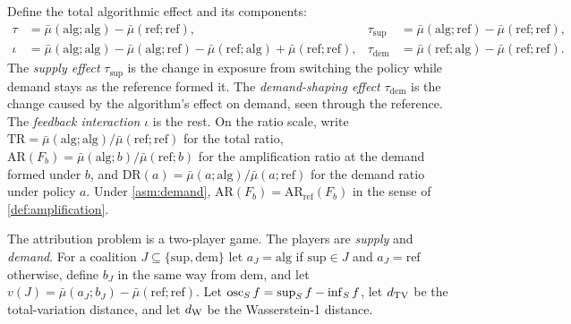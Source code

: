 Define the total algorithmic effect and its components:
\begin{equation}\label{eq:est-components}
\begin{aligned}
  \tau&=\bar\mu(\mathrm{alg};\mathrm{alg})-\bar\mu(\mathrm{ref};\mathrm{ref}), &
  \tau_{\mathrm{sup}}&=\bar\mu(\mathrm{alg};\mathrm{ref})-\bar\mu(\mathrm{ref};\mathrm{ref}),\\
  \iota&=\bar\mu(\mathrm{alg};\mathrm{alg})-\bar\mu(\mathrm{alg};\mathrm{ref})-\bar\mu(\mathrm{ref};\mathrm{alg})+\bar\mu(\mathrm{ref};\mathrm{ref}), &
  \tau_{\mathrm{dem}}&=\bar\mu(\mathrm{ref};\mathrm{alg})-\bar\mu(\mathrm{ref};\mathrm{ref}).
\end{aligned}
\end{equation}
The \emph{supply effect} $\tau_{\mathrm{sup}}$ is the change in exposure from switching the policy while demand stays as the reference formed it. The \emph{demand-shaping effect} $\tau_{\mathrm{dem}}$ is the change caused by the algorithm's effect on demand, seen through the reference. The \emph{feedback interaction} $\iota$ is the rest. On the ratio scale, write $\mathrm{TR}=\bar\mu(\mathrm{alg};\mathrm{alg})/\bar\mu(\mathrm{ref};\mathrm{ref})$ for the total ratio, $\mathrm{AR}(F_b)=\bar\mu(\mathrm{alg};b)/\bar\mu(\mathrm{ref};b)$ for the amplification ratio at the demand formed under $b$, and $\mathrm{DR}(a)=\bar\mu(a;\mathrm{alg})/\bar\mu(a;\mathrm{ref})$ for the demand ratio under policy $a$. Under \cref{asm:demand}, $\mathrm{AR}(F_b)=\mathrm{AR}_{\mathrm{ref}}(F_b)$ in the sense of \cref{def:amplification}.

The attribution problem is a two-player game. The players are \emph{supply} and \emph{demand}. For a coalition $J\subseteq\{\mathrm{sup},\mathrm{dem}\}$ let $a_J=\mathrm{alg}$ if $\mathrm{sup}\in J$ and $a_J=\mathrm{ref}$ otherwise, define $b_J$ in the same way from $\mathrm{dem}$, and let $v(J)=\bar\mu(a_J;b_J)-\bar\mu(\mathrm{ref};\mathrm{ref})$. Let $\operatorname{osc}_S f=\sup_Sf-\inf_Sf$, let $d_{\mathrm{TV}}$ be the total-variation distance, and let $d_{\mathrm{W}}$ be the Wasserstein-1 distance.

